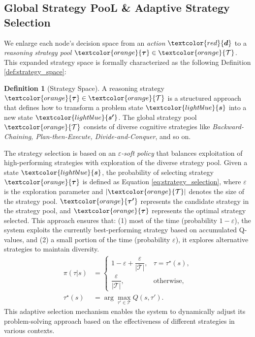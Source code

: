 \documentclass[11pt]{article}
\theoremstyle{definition}
\newtheorem{definition}{Definition}[section]
\theoremstyle{remark}
\begin{document}
\subsection{Global Strategy PooL \& Adaptive Strategy Selection}


We enlarge each node's decision space from an \emph{action} $\textcolor{red}{\boldsymbol{d}}$ to a \emph{reasoning strategy pool} $\textcolor{orange}{\boldsymbol{\tau}} \in \textcolor{orange}{\mathcal{T}}$. This expanded strategy space is formally characterized as the following Definition \autoref{def:strategy_space}:

\begin{definition}[Strategy Space]
\label{def:strategy_space}
A reasoning strategy $\textcolor{orange}{\boldsymbol{\tau}} \in \textcolor{orange}{\mathcal{T}}$ is a structured approach that defines how to transform a problem state $\textcolor{lightblue}{\boldsymbol{s}}$ into a new state $\textcolor{lightblue}{\boldsymbol{s'}}$. The global strategy pool $\textcolor{orange}{\mathcal{T}}$ consists of diverse cognitive strategies like \textit{Backward-Chaining, Plan-then-Execute, Divide-and-Conquer}, and so on.
\end{definition}


The strategy selection is based on an \textit{$\varepsilon$-soft policy} that balances exploitation of high-performing strategies with exploration of the diverse strategy pool. Given a state $\textcolor{lightblue}{\boldsymbol{s}}$, the probability of selecting strategy $\textcolor{orange}{\boldsymbol{\tau}}$ is defined as Equation \ref{eq:strategy_selection}, where $\varepsilon$ is the exploration parameter and $|\textcolor{orange}{\mathcal{T}}|$ denotes the size of the strategy pool. $\textcolor{orange}{\boldsymbol{\tau'}}$ represents the candidate strategy in the strategy pool, and $\textcolor{orange}{\boldsymbol{\tau}}$ represents the optimal strategy selected. This approach ensures that: (1) most of the time (probability $1-\varepsilon$), the system exploits the currently best-performing strategy based on accumulated Q-values, and (2) a small portion of the time (probability $\varepsilon$), it explores alternative strategies to maintain diversity. 
\begin{equation}
\label{eq:strategy_selection}
\begin{aligned}
\pi(\tau|s) &=
\begin{cases}
1-\varepsilon+\dfrac{\varepsilon}{|\mathcal{T}|}, & \tau=\tau^\star(s), \\
\dfrac{\varepsilon}{|\mathcal{T}|}, & \text{otherwise},
\end{cases} \\
\tau^\star(s) &= \arg\max_{\tau'\in\mathcal{T}} Q(s,\tau').
\end{aligned}
\end{equation}
This adaptive selection mechanism enables the system to dynamically adjust its problem-solving approach based on the effectiveness of different strategies in various contexts.
\end{document}
